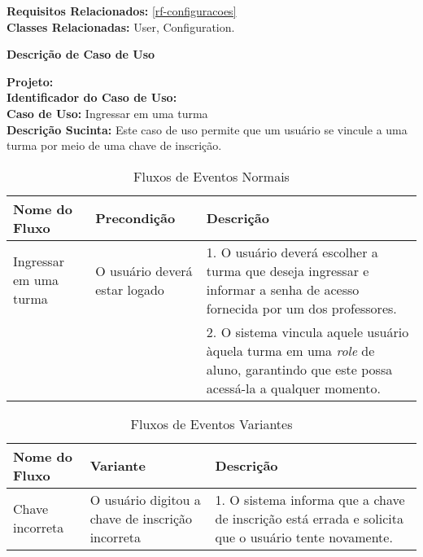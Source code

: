 \noindent  \textbf{Requisitos Relacionados:} \ref{rf-configuracoes}       \\ \textbf{Classes Relacionadas:} User, Configuration.

\newpage
\clearpage
\begin{flushright}    \textbf{Descrição de Caso de Uso}   \end{flushright}         
\noindent \textbf{Projeto:} \imprimirtitulo  \\
\textbf{Identificador do Caso de Uso:} \UC\label{uc-ingressar-turma} \\
\textbf{Caso de Uso:} Ingressar em uma turma \\
\noindent \textbf{Descrição Sucinta:} Este caso de uso permite que um usuário se vincule a uma turma por meio de uma chave de inscrição.\\

\begin{table}[H]
	\centering \vspace{0.5cm} \footnotesize
	\caption{Fluxos de Eventos Normais}
	\begin{tabular}{|p{2.3cm}|p{2.5cm}|p{10cm}|} \hline  \rowcolor[rgb]{0.8,0.8,0.8}
		
		Nome do Fluxo & Precondição & Descrição  \\ \hline		
		
		Ingressar em uma turma & O usuário  deverá estar logado & 1. O usuário deverá escolher a turma que deseja ingressar e informar a senha de acesso fornecida por um  dos professores.  \\
		{} & {} & 2. O sistema vincula aquele usuário àquela turma em uma \textit{role} de aluno, garantindo que este possa acessá-la a qualquer momento.\\ \hline	
	\end{tabular}
\end{table}

\begin{table}[H]
	\centering \vspace{0.5cm} \footnotesize
	\caption{Fluxos de Eventos Variantes}
	\begin{tabular}{|p{2.3cm}|p{1.8cm}|p{10.7cm}|} \hline  \rowcolor[rgb]{0.8,0.8,0.8}
		
		Nome do Fluxo & Variante & Descrição  \\ \hline		
		
		Chave incorreta & O usuário digitou a chave de inscrição incorreta & 1.  O sistema informa que a chave de inscrição está errada e solicita que o usuário tente novamente.  \\ \hline 
		
	\end{tabular}
\end{table}


